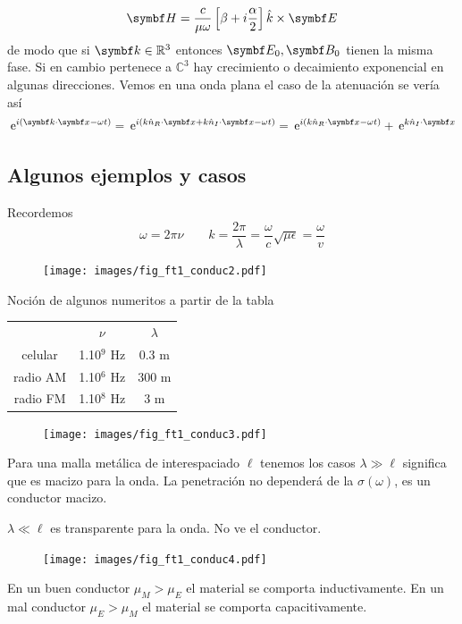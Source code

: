 \documentclass[10pt,oneside]{CBFT_book}
\begin{document}
\[
	\vb{H} = \frac{c}{\mu\omega}\left[ \beta + i \frac{\alpha}{2} \right] \hat{k}\times \vb{E}
\]
de modo que si $\vb{k} \in \mathbb{R}^3$ entonces $\vb{E}_0, \vb{B}_0$ tienen la misma fase. Si en cambio 
 pertenece a $\mathbb{C}^3$ hay crecimiento o decaimiento exponencial en algunas direcciones.
Vemos en una onda plana el caso de la atenuación se vería así
\[
	\euler^{i(\vb{k}\cdot\vb{x}-\omega t)} =
	\euler^{i( k\hat{n}_R \cdot\vb{x} + k\hat{n}_I \cdot\vb{x} -\omega t)} =
	\euler^{i( k\hat{n}_R \cdot\vb{x} -\omega t) } + \euler^{ k\hat{n}_I \cdot\vb{x} }
\]

\subsection{Algunos ejemplos y casos}

Recordemos 
\[
	\omega = 2\pi\nu  \qquad k=\frac{2\pi}{\lambda}=\frac{\omega}{c}\sqrt{\mu\epsilon} =\frac{\omega}{v}
\]

\begin{figure}[htb]
	\begin{center}
	\texttt{[image: images/fig\_ft1\_conduc2.pdf]}	 
	\end{center}
	\caption{}
\end{figure} 

Noción de algunos numeritos a partir de la tabla

\begin{center}
\begin{tabular}{ c c c }
& $\nu$ & $\lambda$ \\
celular & 1.10$^9$ Hz & 0.3 m \\
radio AM  & 1.10$^6$ Hz  & 300 m \\
radio FM & 1.10$^8$ Hz & 3 m
\end{tabular}
\end{center}



\begin{figure}[htb]
	\begin{center}
	\texttt{[image: images/fig\_ft1\_conduc3.pdf]}	 
	\end{center}
	\caption{}
\end{figure} 

Para una malla metálica de interespaciado $\ell$ tenemos los casos
$\lambda \gg \ell$ significa que es macizo para la onda. La penetración no dependerá
de la $\sigma(\omega)$, es un conductor macizo.

$\lambda \ll \ell$ es transparente para la onda. No ve el conductor.

\begin{figure}[htb]
	\begin{center}
	\texttt{[image: images/fig\_ft1\_conduc4.pdf]}	 
	\end{center}
	\caption{}
\end{figure} 

En un buen conductor $ \mu_M > \mu_E $ el material se comporta inductivamente.
En un mal conductor $ \mu_E > \mu_M $ el material se comporta capacitivamente.


\end{document}
